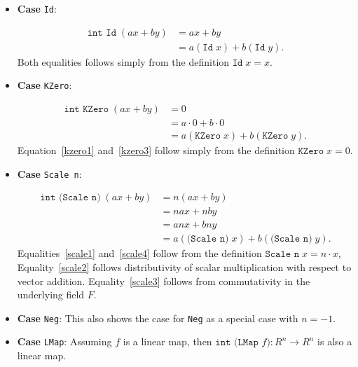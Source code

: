 \begin{itemize}

  \item{\textbf{Case} \texttt{Id}:}


\begin{align*}
  \texttt{int Id}\; (ax + by) &= ax+by \\
  &= a(\texttt{Id}\; x) + b(\texttt{Id} \;y).
\end{align*}
Both equalities follows simply from the definition \( \texttt{Id} \; x = x \).

\item{\textbf{Case} \texttt{KZero}:}


\begin{align}
  \texttt{int KZero}\; (ax + by) &= 0 \label{kzero1} \\
  &= a\cdot 0 + b\cdot 0 \\
  &= a(\texttt{KZero}\; x) + b(\texttt{KZero} \;y).\label{kzero3}
\end{align}
Equation~\eqref{kzero1} and~\eqref{kzero3} follow simply from the definition \( \texttt{KZero} \; x = 0 \).

\item{\textbf{Case} \texttt{Scale n}:}


\begin{align}
  \texttt{int (Scale n)}\; (ax + by)
  &= n (a x + b y) \label{scale1} \\
  &= n a x + n b y \label{scale2} \\
  &= a n x + b n y \label{scale3} \\
  &= a(\texttt{(Scale n)}\; x) + b(\texttt{(Scale n)} \;y).\label{scale4}
\end{align}
Equalities~\eqref{scale1} and~\eqref{scale4} follow from the definition \( \texttt{Scale n} \; x = n\cdot x \),
Equality~\eqref{scale2} follows distributivity of scalar multiplication with respect to vector addition.
Equality~\eqref{scale3} follows from commutativity in the underlying field \(F\).

\item{\textbf{Case} \texttt{Neg}:}
This also shows the case for \texttt{Neg} as a special case with \( n = -1 \).

\item{\textbf{Case} \texttt{LMap}:}
Assuming $f$ is a linear map, then \( \texttt{int (LMap $f$)} \colon R^n \rightarrow
R^n\) is also a linear map.



\end{itemize}
